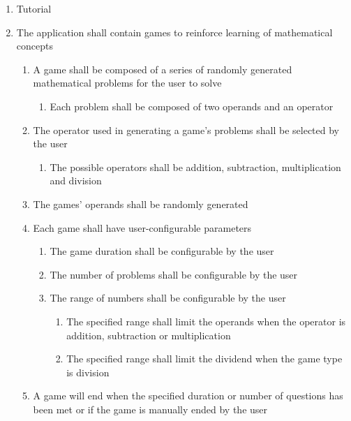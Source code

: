 \documentclass[12pt,letterpaper,oneside]{article}
\begin{document}
\begin{enumerate}
	\item
		Tutorial

	\item	%
		The application shall contain games to reinforce learning of mathematical concepts
		\begin{enumerate}
			\item	%
				A game shall be composed of a series of randomly generated mathematical problems for the user to solve
				\begin{enumerate}
					\item %
						Each problem shall be composed of two operands and an operator
				\end{enumerate}
			\item	%
				The operator used in generating a game's problems shall be selected by the user
				\begin{enumerate}
					\item %
						The possible operators shall be addition, subtraction, multiplication and division
				\end{enumerate}
			\item	%
				The games' operands shall be randomly generated
			\item	%
				Each game shall have user-configurable parameters
				\begin{enumerate}
					\item	%
						The game duration shall be configurable by the user
					\item	%
						The number of problems shall be configurable by the user
					\item	%
						The range of numbers shall be configurable by the user
						\begin{enumerate}
							\item %
								The specified range shall limit the operands when the operator is addition, subtraction or multiplication
							\item %
								The specified range shall limit the dividend when the game type is division
						\end{enumerate}
				\end{enumerate}
			\item	%
				A game will end when the specified duration or number of questions has been met or if the game is manually ended by the user
		\end{enumerate}


\end{enumerate}
\end{document}
